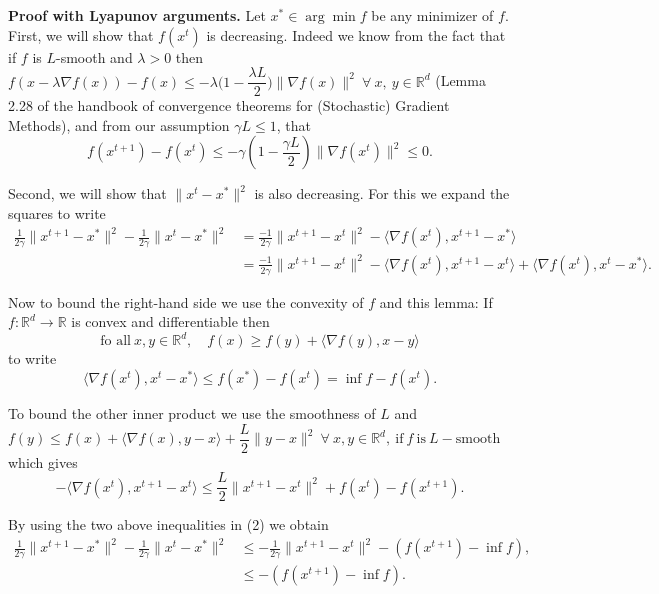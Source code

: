 \documentclass{ExerciseSheet}
\newif\ifsolutions
\begin{document}
\ifsolutions
\vskip 0.3cm
\begin{solution}
    \textbf{Proof  with Lyapunov arguments.}
Let $x^* \in \arg\min f$ be any minimizer of $f$.
First, we will show that $f(x^t)$ is decreasing.
Indeed we know from the fact that if $f$ is $L$-smooth and $\lambda > 0$ then $f(x-\lambda \nabla f(x)) - f(x) \leq -\lambda\bigg(1-\dfrac{\lambda L}{2}\bigg) \|\nabla f(x)\|^2 \ \forall \ x,\ y \in \mathbb{R}^d$ (Lemma 2.28 of the handbook of convergence theorems for (Stochastic) Gradient Methods), and from our assumption $\gamma L \leq 1$, that
\begin{equation}
f(x^{t+1}) - f(x^t) \leq -\gamma \left(1 - \frac{\gamma L}{2} \right)\|\nabla f(x^t)\|^2 \leq 0.
\tag{1}
\end{equation}

Second, we will show that $\|x^t - x^*\|^2$ is also decreasing.
For this we expand the squares to write
\begin{align}
\frac{1}{2\gamma} \|x^{t+1} - x^*\|^2 - \frac{1}{2\gamma} \|x^t - x^*\|^2 
&= \frac{-1}{2\gamma} \|x^{t+1} - x^t\|^2 - \langle \nabla f(x^t), x^{t+1} - x^* \rangle \nonumber \\
&= \frac{-1}{2\gamma} \|x^{t+1} - x^t\|^2 - \langle \nabla f(x^t), x^{t+1} - x^t \rangle + \langle \nabla f(x^t), x^t - x^* \rangle.
\tag{2}
\end{align}

Now to bound the right-hand side we use the convexity of $f$ and this lemma: If $f: \mathbb{R}^d \rightarrow \mathbb{R}$ is convex and differentiable then $$\text{fo all}\ x, y \in \mathbb{R}^d, \quad f(x) \geq f(y)+\langle \nabla f(y), x-y  \rangle$$ to write
\[
\langle \nabla f(x^t), x^t - x^* \rangle \leq f(x^*) - f(x^t) = \inf f - f(x^t).
\]

To bound the other inner product we use the smoothness of $L$ and $f(y)\leq f(x) + \langle \nabla f(x), y-x \rangle + \dfrac{L}{2}\|y-x\|^2\ \forall\ x, y \in \mathbb{R}^d, \ \text{if}\ f\ \text{is}\ L-\text{smooth}$ which gives
\[
-\langle \nabla f(x^t), x^{t+1} - x^t \rangle \leq \frac{L}{2} \|x^{t+1} - x^t\|^2 + f(x^t) - f(x^{t+1}).
\]

By using the two above inequalities in (2) we obtain
\begin{align}
\frac{1}{2\gamma} \|x^{t+1} - x^*\|^2 - \frac{1}{2\gamma} \|x^t - x^*\|^2 
&\leq -\frac{1}{2\gamma} \|x^{t+1} - x^t\|^2 - (f(x^{t+1}) - \inf f), \nonumber \\
&\leq - (f(x^{t+1}) - \inf f).
\tag{3}
\end{align}


\end{solution}
\end{document}
